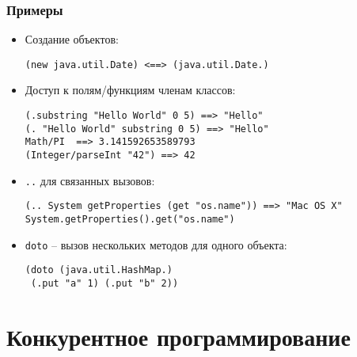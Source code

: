 \documentclass[ignorenonframetext]{beamer}
\begin{document}
\begin{frame}[fragile]
  \frametitle{Примеры}
  \begin{itemize}
  \item Создание объектов:
\begin{lstlisting}
(new java.util.Date) <==> (java.util.Date.)
\end{lstlisting}
  \item Доступ к полям/функциям членам классов:
\begin{lstlisting}
(.substring "Hello World" 0 5) ==> "Hello"
(. "Hello World" substring 0 5) ==> "Hello"
Math/PI  ==> 3.141592653589793
(Integer/parseInt "42") ==> 42
\end{lstlisting}
  \item \texttt{..} для связанных вызовов:
\begin{lstlisting}
(.. System getProperties (get "os.name")) ==> "Mac OS X"
System.getProperties().get("os.name")
\end{lstlisting} %
  \item \texttt{doto} -- вызов нескольких методов для одного объекта:
\begin{lstlisting}
(doto (java.util.HashMap.)
 (.put "a" 1) (.put "b" 2))
\end{lstlisting}
  \end{itemize}
\end{frame}


\section{Конкурентное программирование}
\end{document}
